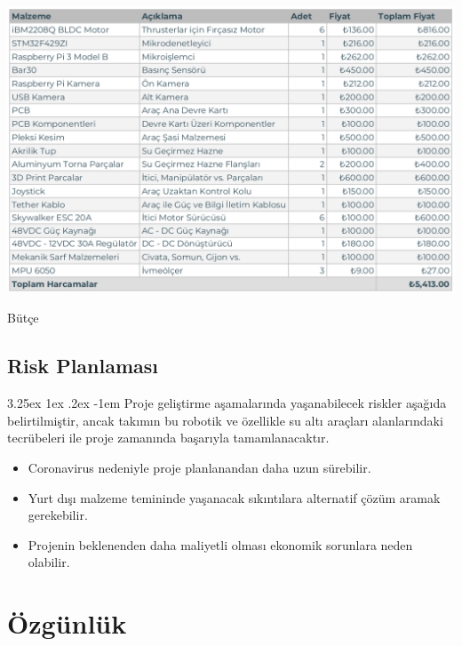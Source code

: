 \documentclass[12pt]{article}
\makeatletter
\renewcommand\paragraph{\@startsection{paragraph}{5}{\z@}%
  {3.25ex \@plus1ex \@minus.2ex}%
  {-1em}%
  {\normalfont\normalsize\bfseries}}
\makeatother
\begin{document}
\begin{table}[hbt!]
\centering
\includegraphics[width=1\textwidth]{butce-final.png}
\caption{Bütçe}
\label{fig:butce}
\end{table}

\subsection{Risk Planlaması}

\paragraph{} Proje geliştirme aşamalarında yaşanabilecek riskler aşağıda belirtilmiştir, ancak takımın bu robotik ve özellikle su altı araçları alanlarındaki tecrübeleri ile proje zamanında başarıyla tamamlanacaktır.

\begin{itemize}
    \item Coronavirus nedeniyle proje planlanandan daha uzun sürebilir.
    \item Yurt dışı malzeme temininde yaşanacak sıkıntılara alternatif çözüm aramak gerekebilir.
    \item Projenin beklenenden daha maliyetli olması ekonomik sorunlara neden olabilir.
\end{itemize}
\newpage
\section{Özgünlük}

\end{document}
